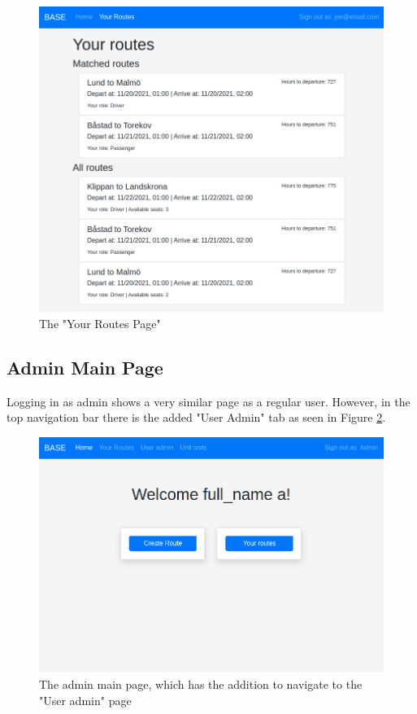 \documentclass{article}
\begin{document}
\begin{figure}[h!]
    \centering
    \includegraphics[scale=0.5]{ssdFigures/your_routes.png}
    \caption{The "Your Routes Page" }
    \label{fig:your_routes}
\end{figure}

\clearpage
\newpage
\subsection{Admin Main Page}
Logging in as admin shows a very similar page as a regular user. However, in the top navigation bar there is the added "User Admin" tab as seen in Figure \ref{fig:admin_main_page}.

\begin{figure}[h!]
    \centering
    \includegraphics[scale=0.5]{ssdFigures/admin_main_page.png}
    \caption{The admin main page, which has the addition to navigate to the "User admin" page}
    \label{fig:admin_main_page}
\end{figure}
\end{document}
